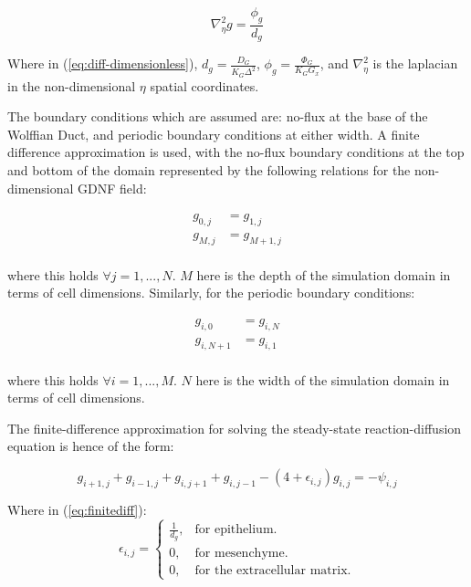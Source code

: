 \documentclass[pdftex,10pt,a4paper]{article}
\begin{document}
\begin{equation}\label{eq:diff-dimensionless}
\nabla_\eta^2 g = \frac{\phi_g}{d_g}
\end{equation}

Where in (\ref{eq:diff-dimensionless}), $d_g = \frac{D_G}{K_G \Delta^2}$, $\phi_g = \frac{\Phi_G}{K_G G_x}$, and $\nabla_\eta^2$ is the laplacian in the non-dimensional $\eta$ spatial coordinates.

The boundary conditions which are assumed are: no-flux at the base of the Wolffian Duct, and periodic boundary conditions at either width. A finite difference approximation is used, with the no-flux boundary conditions at the top and bottom of the domain represented by the following relations for the non-dimensional GDNF field:

\begin{align*}
g_{0,j}& = g_{1,j}\\
g_{M,j}& = g_{M+1,j}\\
\end{align*}

where this holds $\forall j = 1,...,N$. $M$ here is the depth of the simulation domain in terms of cell dimensions. Similarly, for the periodic boundary conditions:

\begin{align*}
g_{i,0}& = g_{i,N}\\
g_{i,N+1}& = g_{i,1}\\
\end{align*}

where this holds $\forall i = 1,...,M$. $N$ here is the width of the simulation domain in terms of cell dimensions.

The finite-difference approximation for solving the steady-state reaction-diffusion equation is hence of the form:

\begin{equation}\label{eq:finitediff}
g_{i+1,j} + g_{i-1,j} + g_{i,j+1} + g_{i,j-1} - (4 + \epsilon_{i,j})g_{i,j} = -\psi_{i,j}
\end{equation}

Where in (\ref{eq:finitediff}):
\begin{equation}
\epsilon_{i,j} =\begin{cases}
\frac{1}{d_g}, & \text{for epithelium}.\\
0, & \text{for mesenchyme}.\\
0, & \text{for the extracellular matrix}.
\end{cases}
\end{equation}
\end{document}
